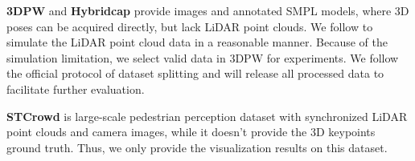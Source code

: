 \documentclass[letterpaper]{article} %
\begin{document}
\noindent \textbf{3DPW}\cite{von20183DPW} and \textbf{Hybridcap}
\cite{liang2022hybridcap} provide images and annotated SMPL models, where 3D poses can be acquired directly, but lack LiDAR point clouds. We follow \cite{cong2021input} to simulate the LiDAR point cloud data in a reasonable manner. Because of the simulation limitation, we select valid data in 3DPW for experiments. 
We follow the official protocol of dataset splitting and will release all processed data to facilitate further evaluation. 



\noindent \textbf{STCrowd}
\cite{Cong_2022_CVPR} is large-scale pedestrian perception dataset with synchronized LiDAR point clouds and camera images, while it doesn't provide the 3D keypoints ground truth. Thus, we only provide the visualization results on this dataset.


\end{document}
